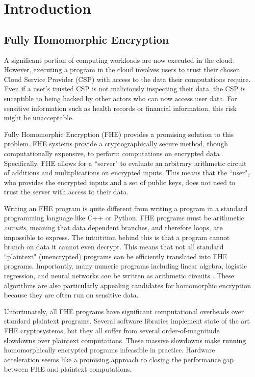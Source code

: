 \section{Introduction}

\subsection{Fully Homomorphic Encryption}

A significant portion of computing workloads are now executed in the cloud.
However, executing a program in the cloud involves users to trust their chosen Cloud Service Provider (CSP)
with access to the data their computations require. Even if a user's trusted CSP is not maliciously inspecting their data,
the CSP is suceptible to being hacked by other actors who can now access user data.
For sensitive information such as health records or financial information, this risk might
be unacceptable.

Fully Homomorphic Encryption (FHE) provides a promising solution to this problem.
FHE systems provide a cryptographically secure method, though computationally expensive, to perform computations on
encrypted data \cite{gentry:stoc09:fhe, brakerski:itcs12:bgv, cheon:asiacrypt2017:ckks}.
Specifically, FHE allows for a ``server" to evaluate an arbitrary arithmetic
circuit of additions and mulitplications on encrypted inputs.
This means that the ``user", who provides the encrypted inputs and a set of public keys, 
does not need to trust the server with access to their data.

Writing an FHE program is quite different from writing a program in a standard
programming language like C++ or Python. 
FHE programs must be arithmetic \emph{circuits}, meaning that 
data dependent branches, and therefore loops, are impossible to express.
The intuitition behind this is that a program cannot branch on data it cannot
even decrypt. This means that not all standard ``plaintext" (unencrypted) programs
can be efficiently translated into FHE programs. Importantly, many numeric
programs including linear algebra, logistic regression, and neural networks
\emph{can} be written as arithmetic circuits 
\cite{halevi:acc14:algo-helib, han:iaai19:he-logreg, dowlin:icml16:cryptonets}.
These algorithms are also particularly appealing candidates for homomorphic
encryption because they are often run on sensitive data.

Unfortunately, all FHE programs have significant computational overheads 
over standard plaintext programs.
Several software libraries \cite{palisade, helib, seal}
implement state of the art FHE cryptosystems, but they all
suffer from several order-of-magnitude slowdowns over plaintext computations.
These massive slowdowns make running homomorphically encrypted programs
infeasible in practice.
Hardware acceleration seems like a promising approach to closing the
performance gap between FHE and plaintext computations.

